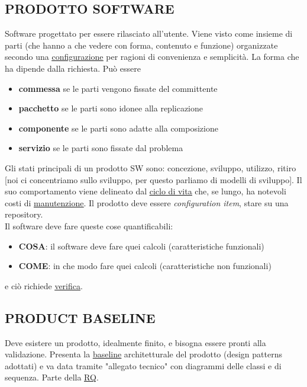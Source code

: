 		\subsection{PRODOTTO SOFTWARE}  \label{prodotto}
		Software progettato per essere rilasciato all'utente. Viene visto come insieme di parti (che hanno a che vedere con forma, contenuto e funzione) organizzate secondo una \underline{\hyperref[configurazione]{configurazione}} per ragioni di convenienza e semplicità. La forma che ha dipende dalla richiesta. Può essere
			\begin{itemize}
				\item \textbf{commessa} se le parti vengono fissate del committente
				\item \textbf{pacchetto} se le parti sono idonee alla replicazione
				\item \textbf{componente} se le parti sono adatte alla composizione
				\item \textbf{servizio} se le parti sono fissate dal problema
			\end{itemize}
		Gli stati principali di un prodotto SW sono: concezione, sviluppo, utilizzo, ritiro [noi ci concentriamo sullo sviluppo, per questo parliamo di modelli di sviluppo].
		Il suo comportamento viene delineato dal \underline{\hyperref[ciclo]{ciclo di vita}} che, se lungo, ha notevoli costi di \underline{\hyperref[manutenzione]{manutenzione}}.
		Il prodotto deve essere \textit{configuration item}, stare su una repository. \\
		Il software deve fare queste cose quantificabili:
		\begin{itemize}
			\item \textbf{COSA}: il software deve fare quei calcoli (caratteristiche funzionali)
			\item \textbf{COME}: in che modo fare quei calcoli (caratteristiche non funzionali)
		\end{itemize}
		e ciò richiede \underline{\hyperref[verificare]{verifica}}.


		\subsection{PRODUCT BASELINE}	 \label{productbaseline}
		Deve esistere un prodotto, idealmente finito, e bisogna essere pronti alla validazione. Presenta la \underline{\hyperref[baseline]{baseline}} architetturale del prodotto (design patterns adottati) e va data tramite "allegato tecnico" con diagrammi delle classi e di sequenza. Parte della \underline{\hyperref[RQ]{RQ}}.



